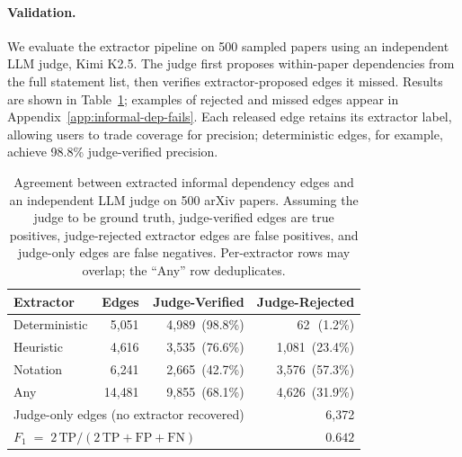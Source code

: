 \paragraph{Validation.}
We evaluate the extractor pipeline on 500 sampled papers using an independent LLM judge, Kimi K2.5. The judge first proposes within-paper dependencies from the full statement list, then verifies extractor-proposed edges it missed. Results are shown in Table~\ref{tab:informal-dep-judge}; examples of rejected and missed edges appear in Appendix~\ref{app:informal-dep-fails}. Each released edge retains its extractor label, allowing users to trade coverage for precision; deterministic edges, for example, achieve 98.8\% judge-verified precision.

\begin{table}[ht]
  \centering
  \setlength{\tabcolsep}{3pt}
  \small
  \begin{tabular}{lrrr}
    \toprule
    \textbf{Extractor} & \textbf{Edges} & \textbf{Judge-Verified} & \textbf{Judge-Rejected} \\
    \midrule
    Deterministic & 5{,}051  & 4{,}989\ (98.8\%) &      62\ \,(1.2\%) \\
    Heuristic     & 4{,}616  & 3{,}535\ (76.6\%) & 1{,}081\ (23.4\%) \\
    Notation      & 6{,}241  & 2{,}665\ (42.7\%) & 3{,}576\ (57.3\%) \\
    \midrule
    Any           & 14{,}481 & 9{,}855\ (68.1\%) & 4{,}626\ (31.9\%) \\
    \midrule
    \multicolumn{3}{l}{Judge-only edges (no extractor recovered)} & 6{,}372 \\
    \multicolumn{3}{l}{$F_1 \;=\; 2\,\mathrm{TP} / (2\,\mathrm{TP} + \mathrm{FP} + \mathrm{FN})$} & $0.642$ \\
    \bottomrule
  \end{tabular}
  \caption{Agreement between extracted informal dependency edges and an independent LLM judge on 500 arXiv papers. Assuming the judge to be ground truth, judge-verified edges are true positives, judge-rejected extractor edges are false positives, and judge-only edges are false negatives. Per-extractor rows may overlap; the ``Any'' row deduplicates.}
  \label{tab:informal-dep-judge}
\end{table}
